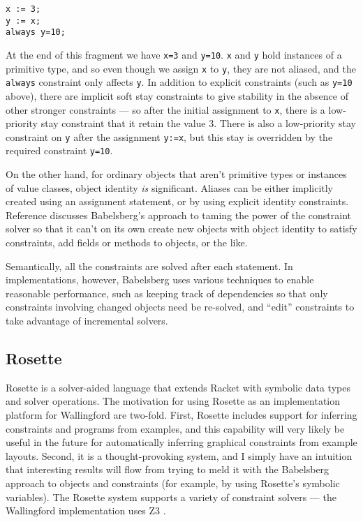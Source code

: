 \documentclass[reprint]{sigplanconf}
\begin{document}
\begin{verbatim}
x := 3;
y := x;
always y=10;
\end{verbatim}

At the end of this fragment we have \verb|x=3| and \verb|y=10|.  \verb|x|
and \verb|y| hold instances of a primitive type, and so even though we
assign \verb|x| to \verb|y|, they are not aliased, and the \verb|always|
constraint only affects \verb|y|.  In addition to explicit constraints
(such as \verb|y=10| above), there are implicit soft stay constraints to
give stability in the absence of other stronger constraints --- so after
the initial assignment to \verb|x|, there is a low-priority stay constraint
that it retain the value 3.  There is also a low-priority stay
constraint on \verb|y| after the assignment \verb|y:=x|, but this stay is
overridden by the required constraint \verb|y=10|.

On the other hand, for ordinary objects that aren't primitive types or
instances of value classes, object identity \emph{is} significant.  Aliases
can be either implicitly created using an assignment statement, or by using
explicit identity constraints.  Reference \cite{felgentreff-oopsla-2015}
discusses Babelsberg's approach to taming the power of the constraint
solver so that it can't on its own create new objects with object identity
to satisfy constraints, add fields or methods to objects, or the like.

Semantically, all the constraints are solved after each statement.  In
implementations, however, Babelsberg uses various techniques to enable
reasonable performance, such as keeping track of dependencies so that only
constraints involving changed objects need be re-solved, and ``edit''
constraints to take advantage of incremental solvers.

\subsection{Rosette}
\label{sec:rosette}

Rosette is a solver-aided 
language that extends Racket \cite{racket} with
symbolic data types and solver operations.  The motivation for using
Rosette as an implementation platform for Wallingford are two-fold.  First,
Rosette includes support for inferring constraints and programs from
examples, and this capability will very likely be useful in the future for
automatically inferring graphical constraints from example layouts.
Second, it is a thought-provoking system, and I simply have
an intuition that interesting results will flow from trying to meld it with
the Babelsberg approach to objects and constraints (for example, by
using Rosette's symbolic variables).
The Rosette system supports a variety of constraint solvers --- the
Wallingford implementation uses Z3 \cite{demoura-z3-2008}.
\end{document}

